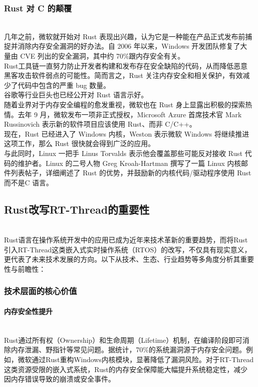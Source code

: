 \subsubsection{Rust 对 C 的颠覆}\ \\
\indent 几年之前，微软就开始对 Rust 表现出兴趣，认为它是一种能在产品正式发布前捕捉并消除内存安全漏洞的好办法。自 2006 年以来，Windows 开发团队修复了大量由 CVE 列出的安全漏洞，其中约 70\%跟内存安全有关。\\
\indent Rust工具链一直努力防止开发者构建和发布存在安全缺陷的代码，从而降低恶意黑客攻击软件弱点的可能性。简而言之，Rust 关注内存安全和相关保护，有效减少了代码中包含的严重 bug 数量。\\
\indent 谷歌等行业巨头也已经公开对 Rust 语言示好。\\
\indent 随着业界对于内存安全编程的愈发重视，微软也在 Rust 身上显露出积极的探索热情。去年 9 月，微软发布一项非正式授权，Microsoft Azure 首席技术官 Mark Russinovich 表示新的软件项目应该使用 Rust、而非 C/C++。\\
\indent 现在，Rust 已经进入了 Windows 内核，Weston 表示微软 Windows 将继续推进这项工作，那么 Rust 很快就会得到广泛的应用。 \\
\indent 与此同时，Linux 一把手 Linus Torvalds 表示他会覆盖那些可能反对接收 Rust 代码的维护者。Linux 的二号人物 Greg Kroah-Hartman 撰写了一篇 Linux 内核邮件列表帖子，详细阐述了 Rust 的优势，并鼓励新的内核代码/驱动程序使用 Rust 而不是C 语言。
\subsection{Rust改写RT-Thread的重要性}\ \\
\indent Rust语言在操作系统开发中的应用已成为近年来技术革新的重要趋势，而将Rust引入RT-Thread这类嵌入式实时操作系统（RTOS）的改写，不仅具有现实意义，更代表了未来技术发展的方向。以下从技术、生态、行业趋势等多角度分析其重要性与前瞻性： \\
\subsubsection{技术层面的核心价值}
\paragraph{内存安全性提升}\ \\
 \indent Rust通过所有权（Ownership）和生命周期（Lifetime）机制，在编译阶段即可消除内存泄漏、野指针等常见问题。据统计，70\%的系统漏洞源于内存安全问题。例如，微软通过Rust重构Windows内核模块，显著降低了漏洞风险。对于RT-Thread这类资源受限的嵌入式系统，Rust的内存安全保障能大幅提升系统稳定性，减少因内存错误导致的崩溃或安全事件。
